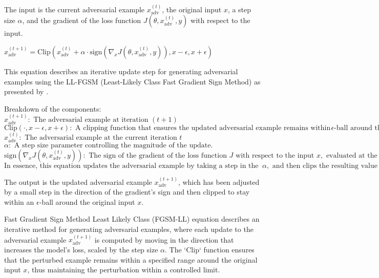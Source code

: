 The input is the current adversarial example \(x_{\text{adv}}^{(t)}\), the original input \(x\), a step size \(\alpha\), and the gradient of the loss function \(J(\theta, x_{\text{adv}}^{(t)}, y)\) with respect to the input.

$x_{\text{adv}}^{(t+1)} = \text{Clip}(x_{\text{adv}}^{(t)} + \alpha \cdot \text{sign}(\nabla_x J(\theta, x_{\text{adv}}^{(t)}, y)), x - \epsilon, x + \epsilon)$

This equation describes an iterative update step for generating adversarial examples using the LL-FGSM (Least-Likely Class Fast Gradient Sign Method) as presented by \cite{Tramer-2017}. 

Breakdown of the components:
$x_{\text{adv}}^{(t+1)}: \text{ The adversarial example at iteration } (t+1)$
$\text{Clip}(\cdot, x - \epsilon, x + \epsilon): \text{ A clipping function that ensures the updated adversarial example remains within an } \epsilon \text{-ball around the original input } x. \text{ This is done by clipping the values to be within the range } [x - \epsilon, x + \epsilon]$
$x_{\text{adv}}^{(t)}: \text{ The adversarial example at the current iteration } t$
$\alpha: \text{ A step size parameter controlling the magnitude of the update.}$
$\text{sign}(\nabla_x J(\theta, x_{\text{adv}}^{(t)}, y)): \text{ The sign of the gradient of the loss function } J \text{ with respect to the input } x, \text{ evaluated at the current adversarial example } x_{\text{adv}}^{(t)}. \text{ Here, } \theta \text{ represents the model parameters and } y \text{ is the true label of the input.}$
$\text{In essence, this equation updates the adversarial example by taking a step in the direction of the gradient's sign, scaled by } \alpha, \text{ and then clips the resulting value to ensure it remains within the allowable perturbation range around the original input } x$

The output is the updated adversarial example \(x_{\text{adv}}^{(t+1)}\), which has been adjusted by a small step in the direction of the gradient's sign and then clipped to stay within an \(\epsilon\)-ball around the original input \(x\).

Fast Gradient Sign Method Least Likely Class (FGSM-LL) equation describes an iterative method for generating adversarial examples, where each update to the adversarial example \(x_{\text{adv}}^{(t+1)}\) is computed by moving in the direction that increases the model's loss, scaled by the step size \(\alpha\). The `Clip` function ensures that the perturbed example remains within a specified range around the original input \(x\), thus maintaining the perturbation within a controlled limit.
